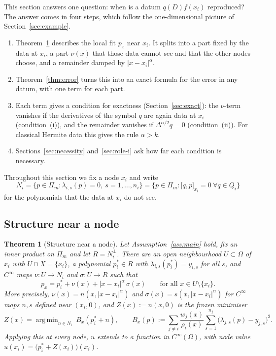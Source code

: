 \documentclass[12pt]{amsart}
\newtheorem{theorem}{Theorem}[section]
\theoremstyle{definition}
\theoremstyle{remark}
\newcommand{\Pm}{\Pi_m}
\newcommand{\fpz}[3]{\bigl[#1,#2\bigr]_{#3}}     %
\DeclareMathOperator*{\argmin}{arg\,min}
\begin{document}
This section answers one question: when is a datum $q(D)f(x_i)$ reproduced? The answer comes in
four steps, which follow the one-dimensional picture of Section~\ref{sec:example}.
\begin{enumerate}[label=\arabic*.]
  \item Theorem~\ref{thm:structure} describes the local fit $p_x$ near $x_i$. It splits into a
        part fixed by the data at $x_i$, a part $\nu(x)$ that those data cannot see and that the
        other nodes choose, and a remainder damped by $|x-x_i|^\alpha$.
  \item Theorem~\ref{thm:error} turns this into an exact formula for the error in any datum,
        with one term for each part.
  \item Each term gives a condition for exactness (Section~\ref{sec:exact}): the $\nu$-term
        vanishes if the derivatives of the symbol $q$ are again data at $x_i$ (condition~(i)),
        and the remainder vanishes if $\Delta^{\alpha/2}q=0$ (condition~(ii)). For classical
        Hermite data this gives the rule $\alpha>k$.
  \item Sections~\ref{sec:necessity} and~\ref{sec:role-i} ask how far each condition is
        necessary.
\end{enumerate}

Throughout this section we fix a node $x_i$ and write
\[
  N_i=\{p\in\Pm:\lambda_{i,s}(p)=0,\ s=1,\dots,n_i\}=\{p\in\Pm:\fpz{q}{p}{x_i}=0\ \forall q\in Q_i\}
\]
for the polynomials that the data at $x_i$ do not see.

\subsection{Structure near a node}

\begin{theorem}[Structure near a node]\label{thm:structure}
Let Assumption~\ref{ass:main} hold, fix an inner product on $\Pm$ and let $R=N_i^\perp$. There
are an open neighbourhood $U\subset\Omega$ of $x_i$ with $U\cap X=\{x_i\}$, a polynomial
$p_i^*\in R$ with $\lambda_{i,s}(p_i^*)=y_{i,s}$ for all $s$, and $C^\infty$ maps
$\nu:U\to N_i$ and $\sigma:U\to R$ such that
\begin{equation}\label{eq:structure}
  p_x=p_i^*+\nu(x)+|x-x_i|^{\alpha}\,\sigma(x)\qquad\text{for all }x\in U\setminus\{x_i\}.
\end{equation}
More precisely, $\nu(x)=n(x,|x-x_i|^\alpha)$ and $\sigma(x)=s(x,|x-x_i|^\alpha)$ for $C^\infty$
maps $n,s$ defined near $(x_i,0)$, and $Z(x):=n(x,0)$ is the \emph{frozen minimiser}
\begin{equation}\label{eq:frozen}
  Z(x)=\argmin_{n\in N_i}\ B_x(p_i^*+n),\qquad
  B_x(p):=\sum_{j\ne i}\frac{w_j(x)}{\rho_i(x)}\sum_{s=1}^{n_j}\bigl(\lambda_{j,s}(p)-y_{j,s}\bigr)^2 .
\end{equation}
Applying this at every node, $u$ extends to a function in $C^\infty(\Omega)$, with node value
$u(x_i)=\bigl(p_i^*+Z(x_i)\bigr)(x_i)$.
\end{theorem}
\end{document}
